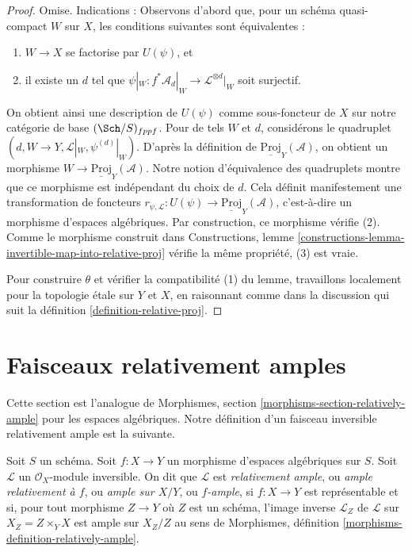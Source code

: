 \begin{proof}
Omise. Indications :
Observons d'abord que, pour un schéma quasi-compact
$W$ sur $X$, les conditions suivantes sont équivalentes :
\begin{enumerate}
\item $W \to X$ se factorise par $U(\psi)$, et
\item il existe un $d$ tel que
$\psi|_W : f^*\mathcal{A}_d|_W \to \mathcal{L}^{\otimes d}|_W$
soit surjectif.
\end{enumerate}
On obtient ainsi une description de $U(\psi)$ comme sous-foncteur de $X$
sur notre catégorie de base $(\Sch/S)_{fppf}$. Pour de tels $W$ et $d$,
considérons le quadruplet
$(d, W \to Y, \mathcal{L}|_W, \psi^{(d)}|_W)$.
D'après la définition de $\underline{\text{Proj}}_Y(\mathcal{A})$,
on obtient un morphisme $W \to \underline{\text{Proj}}_Y(\mathcal{A})$.
Notre notion d'équivalence des quadruplets montre que
ce morphisme est indépendant du choix de $d$.
Cela définit manifestement une transformation de foncteurs
$r_{\psi, \mathcal{L}} : U(\psi) \to \underline{\text{Proj}}_Y(\mathcal{A})$,
c'est-à-dire un morphisme d'espaces algébriques.
Par construction, ce morphisme vérifie (2).
Comme le morphisme construit dans
Constructions, lemme \ref{constructions-lemma-invertible-map-into-relative-proj}
vérifie la même propriété, (3) est vraie.

\medskip\noindent
Pour construire $\theta$ et vérifier la compatibilité (1) du
lemme, travaillons localement pour la topologie \'etale sur $Y$ et $X$, en raisonnant comme
dans la discussion qui suit la
définition \ref{definition-relative-proj}.
\end{proof}








\section{Faisceaux relativement amples}
\label{section-relatively-ample}

\noindent
Cette section est l'analogue de
Morphismes, section \ref{morphisms-section-relatively-ample}
pour les espaces algébriques.
Notre définition d'un faisceau inversible relativement ample est
la suivante.

\begin{definition}
\label{definition-relatively-ample}
Soit $S$ un schéma.
Soit $f : X \to Y$ un morphisme d'espaces algébriques sur $S$.
Soit $\mathcal{L}$ un $\mathcal{O}_X$-module inversible.
On dit que $\mathcal{L}$ est {\it relativement ample}, ou {\it ample relativement à $f$},
ou {\it ample sur $X/Y$}, ou {\it $f$-ample}, si $f : X \to Y$
est représentable et si, pour tout morphisme $Z \to Y$
où $Z$ est un schéma, l'image inverse $\mathcal{L}_Z$ de $\mathcal{L}$
sur $X_Z = Z \times_Y X$ est ample sur $X_Z/Z$ au sens de
Morphismes, définition \ref{morphisms-definition-relatively-ample}.
\end{definition}

